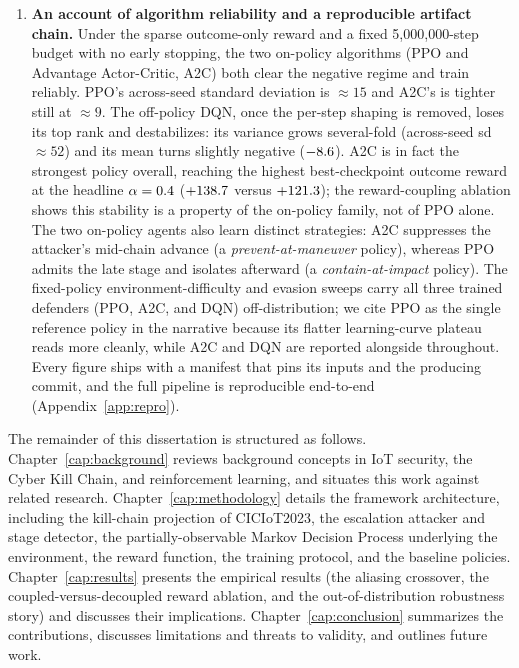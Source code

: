 \begin{enumerate}
    \item \textbf{An account of algorithm reliability and a reproducible artifact chain.} Under the sparse outcome-only reward and a fixed 5{,}000{,}000-step budget with no early stopping, the two on-policy algorithms (PPO and Advantage Actor-Critic, A2C) both clear the negative regime and train reliably. PPO's across-seed standard deviation is $\approx 15$ and A2C's is tighter still at $\approx 9$. The off-policy DQN, once the per-step shaping is removed, loses its top rank and destabilizes: its variance grows several-fold (across-seed sd $\approx 52$) and its mean turns slightly negative ($-8.6$). A2C is in fact the strongest policy overall, reaching the highest best-checkpoint outcome reward at the headline $\alpha = 0.4$ ($+138.7$ versus $+121.3$); the reward-coupling ablation shows this stability is a property of the on-policy family, not of PPO alone. The two on-policy agents also learn distinct strategies: A2C suppresses the attacker's mid-chain advance (a \emph{prevent-at-maneuver} policy), whereas PPO admits the late stage and isolates afterward (a \emph{contain-at-impact} policy). The fixed-policy environment-difficulty and evasion sweeps carry all three trained defenders (PPO, A2C, and DQN) off-distribution; we cite PPO as the single reference policy in the narrative because its flatter learning-curve plateau reads more cleanly, while A2C and DQN are reported alongside throughout. Every figure ships with a manifest that pins its inputs and the producing commit, and the full pipeline is reproducible end-to-end (Appendix~\ref{app:repro}).
\end{enumerate}

The remainder of this dissertation is structured as follows. Chapter~\ref{cap:background} reviews background concepts in IoT security, the Cyber Kill Chain, and reinforcement learning, and situates this work against related research. Chapter~\ref{cap:methodology} details the framework architecture, including the kill-chain projection of CICIoT2023, the escalation attacker and stage detector, the partially-observable Markov Decision Process underlying the environment, the reward function, the training protocol, and the baseline policies. Chapter~\ref{cap:results} presents the empirical results (the aliasing crossover, the coupled-versus-decoupled reward ablation, and the out-of-distribution robustness story) and discusses their implications. Chapter~\ref{cap:conclusion} summarizes the contributions, discusses limitations and threats to validity, and outlines future work.
